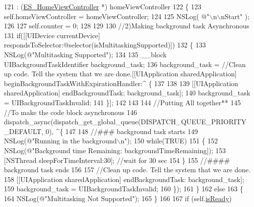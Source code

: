 \begin{DoxyCode}
121                              : (\hyperlink{interface_e_s___home_view_controller}{ES\_HomeViewController} *) homeViewController
122 \{
123     \textcolor{keyword}{self}.homeViewController = homeViewController;
124     
125     NSLog( \textcolor{stringliteral}{@"\(\backslash\)n\(\backslash\)nStart"} );
126     
127     \textcolor{keyword}{self}.counter = 0;
128     
129     
130     \textcolor{comment}{//2)Making background task Asynchronous}
131     \textcolor{keywordflow}{if}([[UIDevice currentDevice] respondsToSelector:\textcolor{keyword}{@selector}(isMultitaskingSupported)])
132     \{
133         NSLog(\textcolor{stringliteral}{@"Multitasking Supported"});
134         
135         \_\_block UIBackgroundTaskIdentifier background\_task;
136         background\_task = \textcolor{comment}{//Clean up code. Tell the system that we are done.}[[UIApplication 
      sharedApplication] beginBackgroundTaskWithExpirationHandler:^ \{
137             
138             
139             [[UIApplication sharedApplication] endBackgroundTask: background\_task];
140             background\_task = UIBackgroundTaskInvalid;
141         \}];
142         
143         
144         \textcolor{comment}{//Putting All together**}
145         \textcolor{comment}{//To make the code block asynchronous}
146         dispatch\_async(dispatch\_get\_global\_queue(DISPATCH\_QUEUE\_PRIORITY\_DEFAULT, 0), ^\{
147             
148             \textcolor{comment}{//### background task starts}
149             NSLog(\textcolor{stringliteral}{@"Running in the background\(\backslash\)n"});
150             \textcolor{keywordflow}{while}(TRUE)
151             \{
152                 NSLog(\textcolor{stringliteral}{@"Background time Remaining: %
      backgroundTimeRemaining]);
153                 [NSThread sleepForTimeInterval:30]; \textcolor{comment}{//wait for 30 sec}
154             \}
155             \textcolor{comment}{//#### background task ends}
156             
157             \textcolor{comment}{//Clean up code. Tell the system that we are done.}
158             [[UIApplication sharedApplication] endBackgroundTask: background\_task];
159             background\_task = UIBackgroundTaskInvalid;
160         \});
161     \}
162     \textcolor{keywordflow}{else}
163     \{
164         NSLog(\textcolor{stringliteral}{@"Multitasking Not Supported"});
165     \}
166     
167     \textcolor{keywordflow}{if} (\textcolor{keyword}{self}.\hyperlink{interface_e_s___scheduler_aa577ad94a53124632e4c40be7d3cb289}{isReady})
}
\end{DoxyCode}
